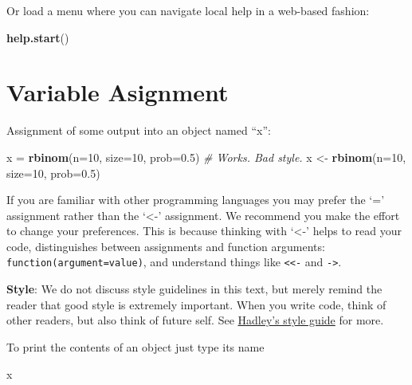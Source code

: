 \documentclass[]{book}
\newenvironment{Shaded}{\begin{snugshade}}{\end{snugshade}}
\newcommand{\KeywordTok}[1]{\textcolor[rgb]{0.13,0.29,0.53}{\textbf{{#1}}}}
\newcommand{\DataTypeTok}[1]{\textcolor[rgb]{0.13,0.29,0.53}{{#1}}}
\newcommand{\DecValTok}[1]{\textcolor[rgb]{0.00,0.00,0.81}{{#1}}}
\newcommand{\FloatTok}[1]{\textcolor[rgb]{0.00,0.00,0.81}{{#1}}}
\newcommand{\StringTok}[1]{\textcolor[rgb]{0.31,0.60,0.02}{{#1}}}
\newcommand{\CommentTok}[1]{\textcolor[rgb]{0.56,0.35,0.01}{\textit{{#1}}}}
\newcommand{\NormalTok}[1]{{#1}}
\theoremstyle{definition}
\theoremstyle{definition}
\theoremstyle{remark}
\let\BeginKnitrBlock\begin \let\EndKnitrBlock\end
\begin{document}
Or load a menu where you can navigate local help in a web-based fashion:

\begin{Shaded}
\begin{Highlighting}[]
\KeywordTok{help.start}\NormalTok{() }
\end{Highlighting}
\end{Shaded}

\section{Variable Asignment}\label{variable-asignment}

Assignment of some output into an object named ``x'':

\begin{Shaded}
\begin{Highlighting}[]
\NormalTok{x =}\StringTok{ }\KeywordTok{rbinom}\NormalTok{(}\DataTypeTok{n=}\DecValTok{10}\NormalTok{, }\DataTypeTok{size=}\DecValTok{10}\NormalTok{, }\DataTypeTok{prob=}\FloatTok{0.5}\NormalTok{) }\CommentTok{# Works. Bad style.}
\NormalTok{x <-}\StringTok{ }\KeywordTok{rbinom}\NormalTok{(}\DataTypeTok{n=}\DecValTok{10}\NormalTok{, }\DataTypeTok{size=}\DecValTok{10}\NormalTok{, }\DataTypeTok{prob=}\FloatTok{0.5}\NormalTok{) }
\end{Highlighting}
\end{Shaded}

If you are familiar with other programming languages you may prefer the
`=' assignment rather than the `\textless{}-' assignment. We recommend
you make the effort to change your preferences. This is because thinking
with `\textless{}-' helps to read your code, distinguishes between
assignments and function arguments: \texttt{function(argument=value)},
and understand things like \texttt{\textless{}\textless{}-} and
\texttt{-\textgreater{}}.

\BeginKnitrBlock{remark}
\textbf{Style}: We do not discuss style
guidelines in this text, but merely remind the reader that good style is
extremely important. When you write code, think of other readers, but
also think of future self. See
\href{http://adv-r.had.co.nz/Style.html}{Hadley's style guide} for more.
\EndKnitrBlock{remark}

To print the contents of an object just type its name

\begin{Shaded}
\begin{Highlighting}[]
\NormalTok{x}
\end{Highlighting}
\end{Shaded}
\end{document}
